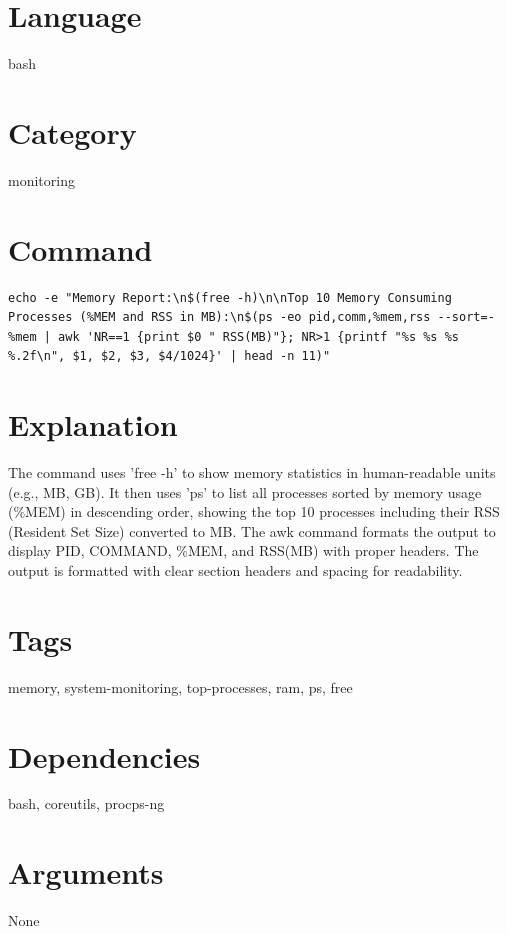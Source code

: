 \documentclass[openany]{book}
\begin{document}
\section*{Language}
bash

\section*{Category}
monitoring

\section*{Command}
\begin{lstlisting}
echo -e "Memory Report:\n$(free -h)\n\nTop 10 Memory Consuming Processes (%MEM and RSS in MB):\n$(ps -eo pid,comm,%mem,rss --sort=-%mem | awk 'NR==1 {print $0 " RSS(MB)"}; NR>1 {printf "%s %s %s %.2f\n", $1, $2, $3, $4/1024}' | head -n 11)"
\end{lstlisting}

\section*{Explanation}
The command uses 'free -h' to show memory statistics in human-readable units (e.g., MB, GB). It then uses 'ps' to list all processes sorted by memory usage (\%MEM) in descending order, showing the top 10 processes including their RSS (Resident Set Size) converted to MB. The awk command formats the output to display PID, COMMAND, \%MEM, and RSS(MB) with proper headers. The output is formatted with clear section headers and spacing for readability.

\section*{Tags}
memory, system-monitoring, top-processes, ram, ps, free

\section*{Dependencies}
bash, coreutils, procps-ng


\section*{Arguments}
None
\end{document}

